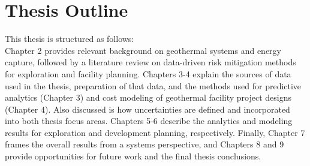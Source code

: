 \section{Thesis Outline}\label{ch1:outline}
This thesis is structured as follows: \\ 
Chapter 2 provides relevant background on geothermal systems and energy capture, followed by a literature review on data-driven risk mitigation methods for exploration and facility planning. Chapters 3-4 explain the sources of data used in the thesis, preparation of that data, and the methods used for predictive analytics (Chapter 3) and cost modeling of geothermal facility project designs (Chapter 4). Also discussed is how uncertainties are defined and incorporated into both thesis focus areas. Chapters 5-6 describe the analytics and modeling results for exploration and development planning, respectively. Finally, Chapter 7 frames the overall results from a systems perspective, and Chapters 8 and 9 provide opportunities for future work and the final thesis conclusions. 
